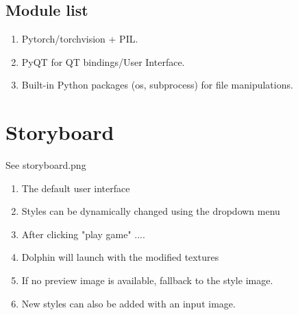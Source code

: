 \documentclass[12pt]{article}
\begin{document}
\subsection{Module list}
\begin{enumerate}
	\item Pytorch/torchvision + PIL.
	\item PyQT for QT bindings/User Interface.
	\item Built-in Python packages (os, subprocess) for file manipulations.
\end{enumerate}
\section{Storyboard}
See storyboard.png
\begin{enumerate}[(1)]
    \item The default user interface
    \item Styles can be dynamically changed using the dropdown menu
    \item After clicking "play game" ....
    \item Dolphin will launch with the modified textures
    \item If no preview image is available, fallback to the style image.
    \item New styles can also be added with an input image.
\end{enumerate}
\end{document}
